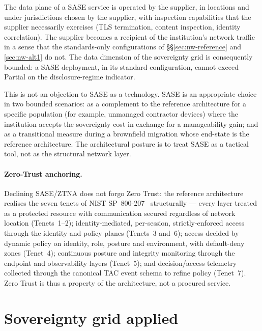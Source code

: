The data plane of a SASE service is operated by the supplier, in
locations and under jurisdictions chosen by the supplier, with
inspection capabilities that the supplier necessarily exercises (TLS
termination, content inspection, identity correlation). The supplier
becomes a recipient of the institution's network traffic in a sense
that the standards-only configurations of \S\S\ref{sec:nw-reference}
and \ref{sec:nw-alt1} do not. The data dimension of the sovereignty
grid is consequently bounded: a SASE deployment, in its standard
configuration, cannot exceed Partial on the disclosure-regime
indicator.

This is not an objection to SASE as a technology. SASE is an
appropriate choice in two bounded scenarios: as a complement to the
reference architecture for a specific population (for example,
unmanaged contractor devices) where the institution accepts the
sovereignty cost in exchange for a manageability gain; and as a
transitional measure during a brownfield migration whose end-state
is the reference architecture. The architectural posture is to
treat SASE as a tactical tool, not as the structural network layer.

\paragraph{Zero-Trust anchoring.} Declining SASE/ZTNA does not
forgo Zero Trust: the reference architecture realises the seven
tenets of NIST SP~800-207~\cite{nist-zt} structurally --- every
layer treated as a protected resource with communication secured
regardless of network location (Tenets~1--2); identity-mediated,
per-session, strictly-enforced access through the identity and
policy planes (Tenets~3 and~6); access decided by dynamic policy on
identity, role, posture and environment, with default-deny zones
(Tenet~4); continuous posture and integrity monitoring through the
endpoint and observability layers (Tenet~5); and decision/access
telemetry collected through the canonical TAC event schema to refine
policy (Tenet~7). Zero Trust is thus a property of the architecture,
not a procured service.

\section{Sovereignty grid applied}
\label{sec:nw-sovereignty}

